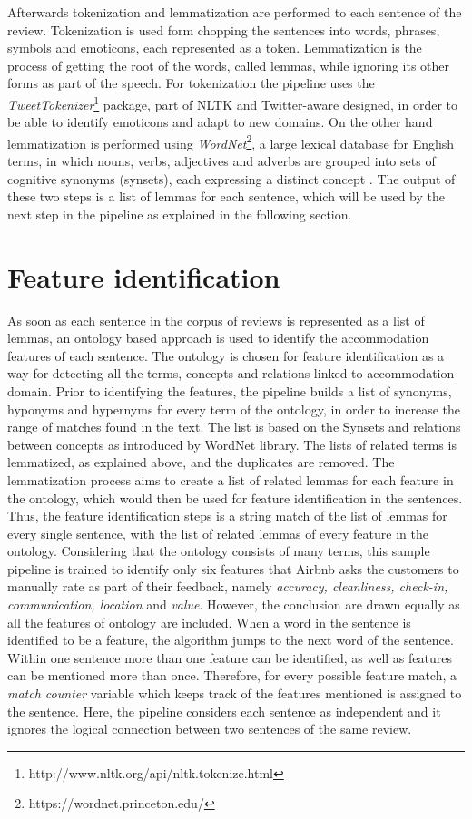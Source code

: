 Afterwards tokenization and lemmatization are performed to each sentence of the review. Tokenization is used form chopping the sentences into words, phrases, symbols and emoticons, each represented as a token. Lemmatization is the process of getting the root of the words, called lemmas, while ignoring its other forms as part of the speech. For tokenization the pipeline uses the \textit{TweetTokenizer}\footnote{http://www.nltk.org/api/nltk.tokenize.html} package, part of NLTK and Twitter-aware designed, in order to be able to identify emoticons and adapt to new domains. On the other hand lemmatization is performed using \textit{WordNet}\footnote{https://wordnet.princeton.edu/}, a large lexical database for English terms, in which nouns, verbs, adjectives and adverbs are grouped into sets of cognitive synonyms (synsets), each expressing a distinct concept \cite{miller1995wordnet}. The output of these two steps is a list of lemmas for each sentence, which will be used by the next step in the pipeline as explained in the following section.  
%
\section{Feature identification}
As soon as each sentence in the corpus of reviews is represented as a list of lemmas, an ontology based approach is used to identify the accommodation features of each sentence. The ontology is chosen for feature identification as a way for detecting all the terms, concepts and relations linked to accommodation domain. Prior to identifying the features, the pipeline builds a list of synonyms, hyponyms and hypernyms for every term of the ontology, in order to increase the range of matches found in the text. The list is based on the Synsets and relations between concepts as introduced by WordNet library. The lists of related terms is lemmatized, as explained above, and the duplicates are removed. The lemmatization process aims to create a list of related lemmas for each feature in the ontology, which would then be used for feature identification in the sentences.
Thus, the feature identification steps is a string match of the list of lemmas for every single sentence, with the list of related lemmas of every feature in the ontology. Considering that the ontology consists of many terms, this sample pipeline is trained to identify only six features that Airbnb asks the customers to manually rate as part of their feedback, namely \textit{accuracy, cleanliness, check-in, communication, location} and \textit{value}. However, the conclusion are drawn equally as all the features of ontology are included.
When a word in the sentence is identified to be a feature, the algorithm jumps to the next word of the sentence. Within one sentence more than one feature can be identified, as well as features can be mentioned more than once. Therefore, for every possible feature match, a\textit{ match counter } variable which keeps track of the features mentioned is assigned to the sentence. Here, the pipeline considers each sentence as independent and it ignores the logical connection between two sentences of the same review.

